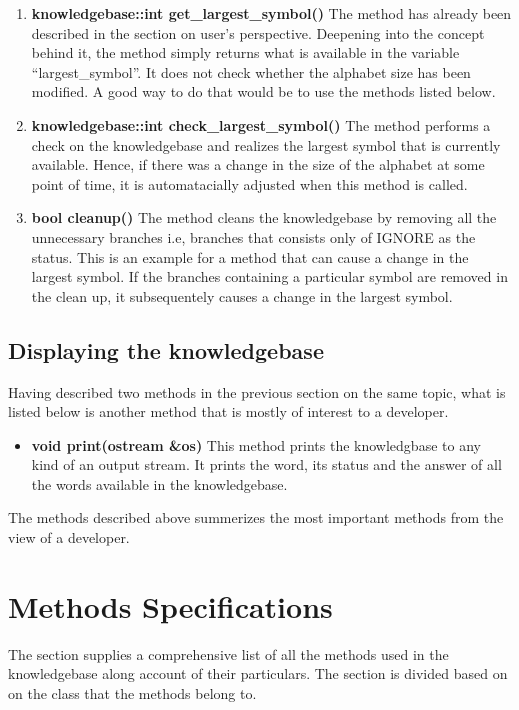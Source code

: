 \begin{enumerate}
\item \textbf{knowledgebase::int get\_largest\_symbol()} \vskip 1pt
The method has already been described in the section on user's perspective. Deepening into the concept behind it, the method simply returns what is available in the variable ``largest\_symbol''. It does not check whether the alphabet size has been modified. A good way to do that would be to use the methods listed below.
	
\item \textbf{knowledgebase::int check\_largest\_symbol()} \hfill \vskip 1pt
The method performs a check on the knowledgebase and realizes the largest symbol that is currently available. Hence, if there was a change in the size of the alphabet at some point of time, it is automatacially adjusted when this method is called.
	
\item \textbf{bool cleanup()} \hfill \vskip 1pt
The method cleans the knowledgebase by removing all the unnecessary branches i.e, branches that consists only of IGNORE as the status. This is an example for a method that can cause a change in the largest symbol. If the branches containing a particular symbol are removed in the clean up, it subsequentely causes a change in the largest symbol. 
\end{enumerate}

\subsection*{Displaying the knowledgebase}
Having described two methods in the previous section on the same topic, what is listed below is another method that is mostly of interest to a developer. 
\begin{itemize}
 \item \textbf{void print(ostream \&os)} \vskip 1pt
  This method prints the knowledgbase to any kind of an output stream. It prints the word, its status and the answer of all the words available in the knowledgebase.
\end{itemize}

\vskip 1pt
The methods described above summerizes the most important methods from the view of a developer.
	
\section{Methods Specifications}
The section supplies a comprehensive list of all the methods used in the knowledgebase along account of their particulars. The section is divided based on on the class that the methods belong to.
